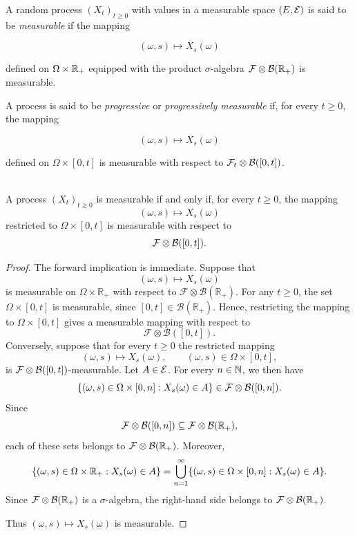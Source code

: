 \begin{definition} \label{chap3.1:definition-measurable_and_progressive_processes}
A random process $(X_t)_{t \geq 0}$ with values in a measurable space
$(E,\mathcal{E})$ is said to be \textit{measurable} if the mapping

$$(\omega,s) \mapsto X_s(\omega)$$

defined on $\Omega \times \mathbb{R}_+$ equipped with the product
$\sigma$-algebra $\mathcal{F} \otimes \mathcal{B}(\mathbb{R}_+)$ is measurable.

A process is said to be \textit{progressive} or
\textit{progressively measurable} if, for every $t \geq 0$, the mapping

$$(\omega,s) \mapsto X_s(\omega)$$

defined on $\Omega \times [0,t]$ is measurable with respect to
$\mathcal{F}_t \otimes \mathcal{B}([0,t])$.
\end{definition}
\begin{proposition}
 \\
A process $(X_t)_{t\geq0}$ is measurable if and only if, for every
$t\geq0$, the mapping
\[
(\omega,s)\mapsto X_s(\omega)
\]
restricted to $\Omega\times[0,t]$ is measurable with respect to
\[
\mathcal{F}\otimes\mathcal{B}([0,t]).
\]
\end{proposition}

\begin{proof}
The forward implication is immediate. Suppose that
$$(\omega,s)\mapsto X_s(\omega)$$
is measurable on $\Omega\times\mathbb R_+$ with respect to
$\mathcal F\otimes\mathcal B(\mathbb R_+)$. For any $t\geq0$, the set
$\Omega\times[0,t]$ is measurable, since $[0,t]\in\mathcal B(\mathbb R_+)$.
Hence, restricting the mapping to $\Omega\times[0,t]$ gives a measurable
mapping with respect to
$$\mathcal F\otimes\mathcal B([0,t]).$$
Conversely, suppose that for every $t\geq0$ the restricted mapping
$$(\omega,s)\mapsto X_s(\omega),
\qquad (\omega,s)\in\Omega\times[0,t],$$
is $\mathcal{F}\otimes\mathcal{B}([0,t])$-measurable.
Let $A\in\mathcal{E}$. For every $n\in\mathbb{N}$, we then have
$$\{(\omega,s)\in\Omega\times[0,n]:X_s(\omega)\in A\}
\in
\mathcal{F}\otimes\mathcal{B}([0,n]).$$
Since
$$\mathcal{F}\otimes\mathcal{B}([0,n])
\subseteq
\mathcal{F}\otimes\mathcal{B}(\mathbb{R}_+),$$
each of these sets belongs to $\mathcal{F}\otimes\mathcal{B}(\mathbb{R}_+)$.
Moreover,
$$\{(\omega,s)\in\Omega\times\mathbb{R}_+:X_s(\omega)\in A\}
=
\bigcup_{n=1}^{\infty}
\{(\omega,s)\in\Omega\times[0,n]:X_s(\omega)\in A\}.$$
Since $\mathcal{F}\otimes\mathcal{B}(\mathbb{R}_+)$ is a $\sigma$-algebra, the right-hand
side belongs to $\mathcal{F}\otimes\mathcal{B}(\mathbb{R}_+)$.

Thus $(\omega,s)\mapsto X_s(\omega)$ is measurable.
\end{proof}

